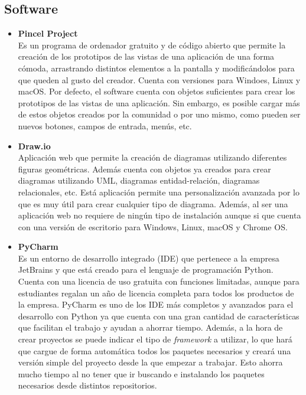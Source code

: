 \subsection{Software}
\begin{itemize}
\item\textbf{Pincel Project}\\
Es un programa de ordenador gratuito y de código abierto que permite la creación de los prototipos de las vistas de una aplicación de una forma cómoda, arrastrando distintos elementos a la pantalla y modificándolos para que queden al gusto del creador. Cuenta con versiones para Windoes, Linux y macOS.
Por defecto, el software cuenta con objetos suficientes para crear los prototipos de las vistas de una aplicación. Sin embargo, es posible cargar más de estos objetos creados por la comunidad o por uno mismo, como pueden ser nuevos botones, campos de entrada, menús, etc.

\item\textbf{Draw.io}\\
Aplicación web que permite la creación de diagramas utilizando diferentes figuras geométricas. Además cuenta con objetos ya creados para crear diagramas utilizando UML, diagramas entidad-relación, diagramas relacionales, etc. Está aplicación permite una personalización avanzada por lo que es muy útil para crear cualquier tipo de diagrama. Además, al ser una aplicación web no requiere de ningún tipo de instalación aunque si que cuenta con una versión de escritorio para Windows, Linux, macOS y Chrome OS.
\item\textbf{PyCharm}\\
Es un entorno de desarrollo integrado (IDE) que pertenece a la empresa JetBrains y que está creado para el lenguaje de programación Python. Cuenta con una licencia de uso gratuita con funciones limitadas, aunque para estudiantes regalan un año de licencia completa para todos los productos de la empresa.
PyCharm es uno de los IDE más completos y avanzados para el desarrollo con Python ya que cuenta con una gran cantidad de características que facilitan el trabajo y ayudan a ahorrar tiempo. Además, a la hora de crear proyectos se puede indicar el tipo de \textit{framework} a utilizar, lo que hará que cargue de forma automática todos los paquetes necesarios y creará una versión simple del proyecto desde la que empezar a trabajar. Esto ahorra mucho tiempo al no tener que ir buscando e instalando los paquetes necesarios desde distintos repositorios. 
\end{itemize}
\subsection{}
